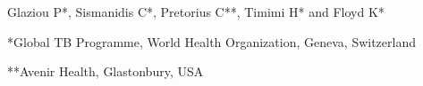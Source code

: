 Glaziou P*, Sismanidis C*, Pretorius C**, Timimi H* and Floyd K*

*Global TB Programme, World Health Organization, Geneva, Switzerland

**Avenir Health, Glastonbury, USA
